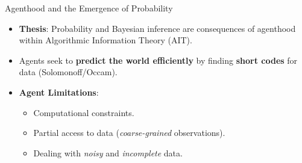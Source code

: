 



\begin{frame}{Agenthood and the Emergence of Probability}
\begin{itemize}
    \item \textbf{Thesis}: Probability and Bayesian inference are consequences of agenthood within Algorithmic Information Theory (AIT).
    \item Agents seek to \textbf{predict the world efficiently} by finding \textbf{short codes} for data (Solomonoff/Occam).
    \item \textbf{Agent Limitations}:
    \begin{itemize}
        \item Computational constraints.
        \item Partial access to data (\textit{coarse-grained} observations).
        \item Dealing with \textit{noisy} and \textit{incomplete} data.
    \end{itemize}
\end{itemize}
\end{frame}

